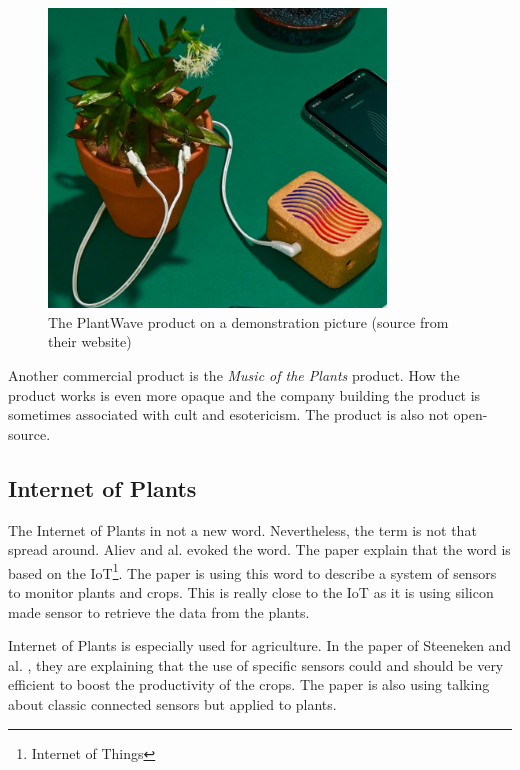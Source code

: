 \begin{figure}[h!]
    \centering
    \includegraphics[width=0.8\textwidth]{images/plant_wave_product.png}
    \caption{The PlantWave product on a demonstration picture (source from their website)}
    \vspace{0.1cm}
    \label{fig:plant_wave_product}
\end{figure}

Another commercial product is the \textit{Music of the Plants} product. How the product works is even more opaque and the company building the product
is sometimes associated with cult and esotericism. The product is also not open-source.


\subsection{Internet of Plants}

The Internet of Plants in not a new word. Nevertheless, the term is not that spread around. Aliev and al. \cite{alievInternetPlantsApplication2018} evoked the word. The paper explain that the word is based on the IoT\footnote{Internet of Things}. The paper is using this word to describe a system of sensors to monitor plants and crops. This is really close to the IoT as it is using silicon made sensor to retrieve the data from the plants.

Internet of Plants is especially used for agriculture. In the paper of Steeneken and al. \cite{steenekenSensorsAgricultureInternet2023}, they are explaining that the use of specific sensors could and should be very efficient to boost the productivity of the crops.
The paper is also using talking about classic connected sensors but applied to plants.


